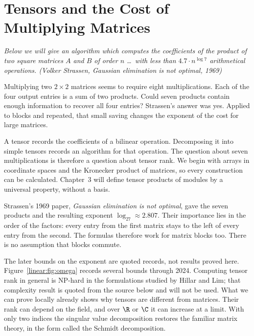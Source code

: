 \chapter{Tensors and the Cost of Multiplying Matrices}\label{linear:ch:tensors}

\begin{center}\itshape
Below we will give an algorithm which computes the coefficients of the product of two square matrices $A$ and $B$ of order $n$
\dots\ with less than $4.7\cdot n^{\log7}$ arithmetical operations.
\upshape(Volker Strassen, \emph{Gaussian elimination is not optimal}, 1969)
\end{center}

Multiplying two $2\times2$ matrices seems to require eight multiplications. Each of the four output entries is a sum of two products. Could seven products contain enough information to recover all four entries? Strassen's answer was yes. Applied to blocks and repeated, that small saving changes the exponent of the cost for large matrices.

A tensor records the coefficients of a bilinear operation. Decomposing it into simple tensors records an algorithm for that operation. The question about seven multiplications is therefore a question about tensor rank. We begin with arrays in coordinate spaces and the Kronecker product of matrices, so every construction can be calculated. Chapter~3 will define tensor products of modules by a universal property, without a basis.

Strassen's 1969 paper, \emph{Gaussian elimination is not optimal}, gave the seven products and the resulting exponent $\log_27\approx2.807$. Their importance lies in the order of the factors: every entry from the first matrix stays to the left of every entry from the second. The formulas therefore work for matrix blocks too. There is no assumption that blocks commute.

The later bounds on the exponent are quoted records, not results proved here. Figure~\ref{linear:fig:omega} records several bounds through 2024. Computing tensor rank in general is NP-hard in the formulations studied by Hillar and Lim; that complexity result is quoted from the source below and will not be used. What we can prove locally already shows why tensors are different from matrices. Their rank can depend on the field, and over $\R$ or $\C$ it can increase at a limit. With only two indices the singular value decomposition restores the familiar matrix theory, in the form called the Schmidt decomposition.

